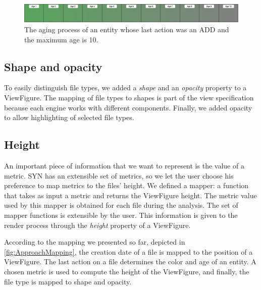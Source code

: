 \begin{figure}
    \center
    \includegraphics[width=\textwidth]{Aging.jpg}
    \caption{The aging process of an entity whose last action was an ADD and the maximum age is 10. }
    \label{fig:Aging}
\end{figure}



\subsection*{Shape and opacity}
To easily distinguish file types, we added a \textit{shape} and an \textit{opacity} property to a ViewFigure.
The mapping of file types to shapes is part of the view specification because each engine works with different components. Finally, we added opacity to allow highlighting of selected file types.
\subsection*{Height}
An important piece of information that we want to represent is the value of a metric. SYN has an extensible set of
metrics, so we let the user choose his preference to map metrics to the files' height. 
We defined a mapper: a function that takes as input a metric and returns the ViewFigure height. The metric value used by this mapper is obtained for each file during the analysis. The set of mapper functions is extensible by the user. \bigbreak
This information is given to the render process through the \textit{height} property of a ViewFigure.

According to the mapping we presented so far, depicted in \autoref{fig:ApproachMapping}, the creation date of a file is mapped to the position of a ViewFigure. The last action on a file determines the color and age of an entity. A chosen metric is used to compute the height of the ViewFigure, and finally, the file type is mapped to shape and opacity. 


